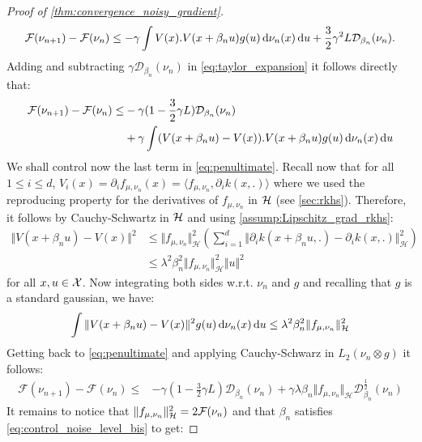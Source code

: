 \begin{proof}[Proof of \cref{thm:convergence_noisy_gradient}]
	\begin{align}\label{eq:taylor_expansion}
	\mathcal{F}(\nu_{n+1})-\mathcal{F}(\nu_{n})
	\leq -\gamma \int V(x).V(x+\beta_n u) g(u)\mathop{}\!\mathrm{d}\nu_n(x)\mathop{}\!\mathrm{d} u + \frac{3}{2}\gamma^2L \mathcal{D}_{\beta_n}(\nu_n).
	\end{align} 
Adding and subtracting  $\gamma \mathcal{D}_{\beta_n}(\nu_n)$ in \cref{eq:taylor_expansion} it follows directly that:
\begin{align}\label{eq:penultimate}
\begin{split}
			\mathcal{F}(\nu_{n+1})-\mathcal{F}(\nu_{n} )\leq &   -\gamma (1-\frac{3}{2}\gamma L )\mathcal{D}_{\beta_n}(\nu_n)
 \\
 &+ \gamma\int  (V(x+\beta_n u) -V(x)).V(x+\beta_n u) g(u)\mathop{}\!\mathrm{d}\nu_n(x)\mathop{}\!\mathrm{d} u	
\end{split}
\end{align}
We shall control now the last term in \cref{eq:penultimate}. Recall now that for all $1\le i\le d$, $ V_i(x) = \partial_i f_{\mu,\nu_n}(x) = \langle f_{\mu,\nu_n} , \partial_i k(x,.)\rangle $ where we used the reproducing property for the derivatives of $f_{\mu,\nu_n}$ in ${{\mathcal H}}$ (see \cref{sec:rkhs}). Therefore, it follows by Cauchy-Schwartz in ${{\mathcal H}}$ and using \cref{assump:Lipschitz_grad_rkhs}:
\begin{align*}
\Vert V(x+\beta_n u) -V(x)\Vert^2
&\leq 
\Vert f_{\mu,\nu_n} \Vert_{\mathcal{H}}^2  \left( \sum_{i=1}^{d}\Vert \partial_i k(x+\beta_n u,.) -\partial_i k(x,.)\Vert^2_{\mathcal{H}}\right)\\
&\leq \lambda^2\beta_n^2
\Vert   f_{\mu,\nu_n}\Vert_{\mathcal{H}}^2\Vert u \Vert^2 
\end{align*}
for all $ x,u \in {{\mathcal X}}$. Now integrating both sides w.r.t. $\nu_n$ and $g$ and recalling that $g$ is a standard gaussian, we have:
\begin{align}
	 \int  \Vert V(x+\beta_n u) -V(x)\Vert^2 g(u)\mathop{}\!\mathrm{d}\nu_n(x)\mathop{}\!\mathrm{d} u
\leq 
	\lambda^2\beta^2_n\Vert f_{\mu,\nu_n} \Vert_{\mathcal{H}}^2
\end{align}
Getting back to \cref{eq:penultimate} and applying Cauchy-Schwarz in $L_2(\nu_n\otimes g)$ it follows:
\begin{align}
	\mathcal{F}(\nu_{n+1})-\mathcal{F}(\nu_{n} )\leq &   -\gamma (1-\frac{3}{2}\gamma L )\mathcal{D}_{\beta_n}(\nu_n) +\gamma \lambda\beta_n\Vert f_{\mu,\nu_n} \Vert_{\mathcal{H}}\mathcal{D}^{\frac{1}{2}}_{\beta_n}(\nu_n)
\end{align}
It remains to notice that $\Vert f_{\mu,\nu_n} \Vert_{\mathcal{H}}^2 = 2{{\mathcal F}}(\nu_n)$ and that $\beta_n$ satisfies \cref{eq:control_noise_level_bis} to get:

\end{proof}
